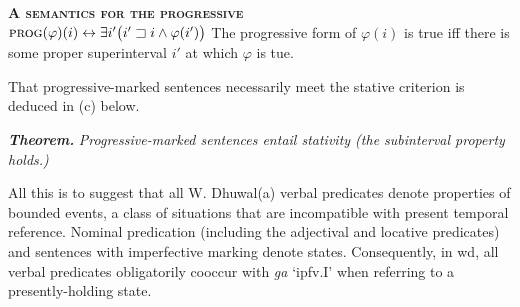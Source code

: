 \a\textbf{\textsc{A semantics for the progressive}}\\
$  \textsc{prog}(\varphi)(i)\leftrightarrow\exists i'\big(i'\sqsupset i \wedge\varphi(i')\big)$
The progressive form of $ \varphi(i) $ is true iff there is some proper superinterval $ i' $ at which $ \varphi $ is tue.
\xe

\noindent That progressive-marked sentences necessarily meet the stative criterion is deduced in (c) below.


\pex[exno=\getref{AspClForm}]\a[label=c.]\textbf{\textit{Theorem.}} \textit{Progressive-marked sentences entail stativity (the subinterval property holds.)}\\
\xe

All this is to suggest that all W. Dhuwal(a) verbal predicates denote properties of bounded events, a class of situations that are incompatible with present temporal reference. Nominal predication (including the adjectival and locative predicates) and sentences with imperfective marking denote states. Consequently, in \gls{wd}, all verbal predicates obligatorily cooccur with \textit{ga} `\gls{ipfv}.\gls{I}' when referring to a presently-holding state. 


